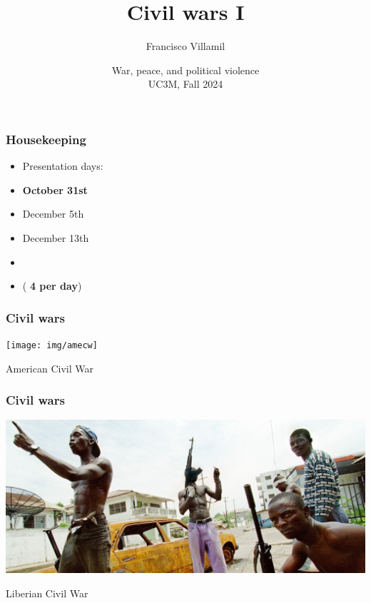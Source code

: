 \documentclass[aspectratio=43]{beamer}
\title{\huge Civil wars I}
\author{Francisco Villamil}
\date{War, peace, and political violence\\UC3M, Fall 2024}
\begin{document}
\begin{frame}
  \titlepage
\end{frame}

\begin{frame}
\frametitle{Housekeeping}
\centering

\begin{itemize}
  \item[] Presentation days:
  \item \textbf{October 31st}
  \item December 5th
  \item December 13th
  \item[]
  \item (\textbf{ 4 per day})
\end{itemize}


\end{frame}
  


\begin{frame}
\frametitle{Civil wars}
\centering

\texttt{[image: img/amecw]}

American Civil War

\end{frame}

\begin{frame}
\frametitle{Civil wars}
\centering

\includegraphics[width = \textwidth]{img/liberia}

Liberian Civil War

\end{frame}
\end{document}
